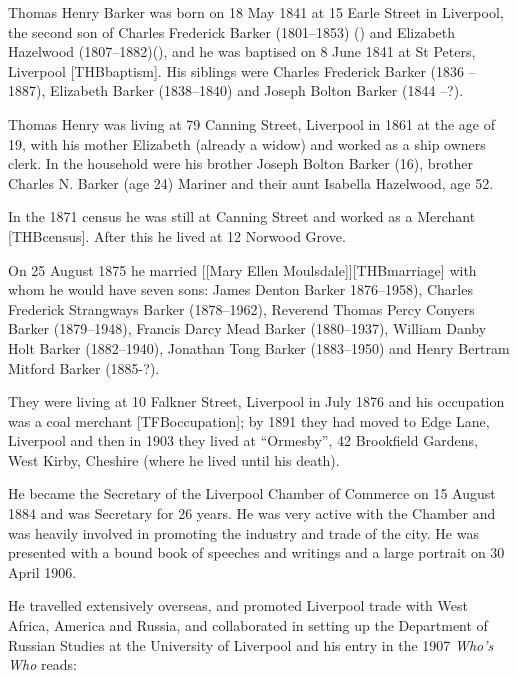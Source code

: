 
Thomas Henry Barker was born on 18 May 1841\cite{THBbirth} at 15 Earle Street in Liverpool,\cite{THBplantagenets} the second son of Charles Frederick Barker (1801--1853) () and Elizabeth Hazelwood (1807--1882)(), and he was baptised on 8 June 1841 at St Peters, Liverpool [THBbaptism].  His siblings were Charles Frederick Barker (1836 -- 1887),  Elizabeth Barker (1838--1840) and Joseph Bolton Barker (1844 --?). 

Thomas Henry was living at 79 Canning Street, Liverpool in 1861 at the age of 19, with his mother Elizabeth (already a widow) and worked as a ship owners clerk.  In the household were his brother Joseph Bolton Barker (16), brother Charles N. Barker (age 24) Mariner and their aunt Isabella Hazelwood, age 52.

In the 1871 census he was still at Canning Street and worked as a Merchant [THBcensus]. After this he lived at 12 Norwood Grove.\cite{THBcensus}


 On 25 August 1875 he married [[Mary Ellen Moulsdale]][THBmarriage] with whom he would have seven sons:\cite{THBplantagenets}  James Denton Barker 1876--1958), Charles Frederick Strangways Barker (1878--1962), Reverend Thomas Percy Conyers Barker (1879--1948), Francis Darcy Mead Barker (1880--1937), William Danby Holt Barker (1882--1940), 
Jonathan Tong Barker (1883--1950) and Henry Bertram Mitford Barker (1885-?).
 
They were living at 10 Falkner Street, Liverpool in July 1876 and his occupation was a coal merchant [TFBoccupation];  by 1891 they had moved to Edge Lane, Liverpool\cite{THBresidence} and then in 1903 they lived at ``Ormesby'', 42 Brookfield Gardens, West Kirby, Cheshire (where he lived until his death).\cite{THBdeathcert}

He became the Secretary of the Liverpool Chamber of Commerce on 15 August 1884 and was Secretary for 26 years.  He was very active with the Chamber and was heavily involved in promoting the industry and trade of the city.  He was presented with a bound book of speeches and writings and a large portrait on 30 April 1906.

He travelled extensively overseas, and promoted Liverpool trade with West Africa, America and Russia, and collaborated in setting up the Department of Russian Studies at the University of Liverpool and his entry in  the 1907 \emph{Who's Who} reads:

